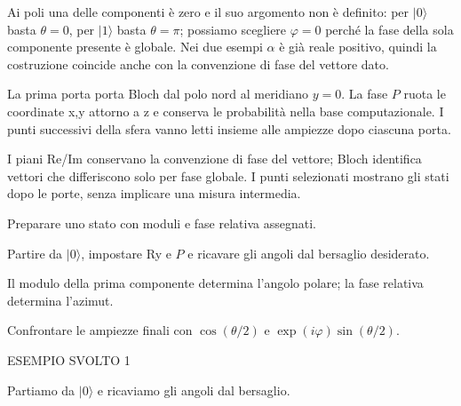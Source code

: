 Ai poli una delle componenti è zero e il suo argomento non è definito: per \(|0\rangle \) basta \(\theta =0\), per \(|1\rangle \) basta \(\theta =\pi \); possiamo scegliere \(\varphi =0\) perché la fase della sola componente presente è globale. Nei due esempi \(\alpha \) è già reale positivo, quindi la costruzione coincide anche con la convenzione di fase del vettore dato.\par

La prima porta porta Bloch dal polo nord al meridiano \(y=0\). La fase \(P\) ruota le coordinate x,y attorno a z e conserva le probabilità nella base computazionale. I punti successivi della sfera vanno letti insieme alle ampiezze dopo ciascuna porta.\par



I piani Re/Im conservano la convenzione di fase del vettore; Bloch identifica vettori che differiscono solo per fase globale. I punti selezionati mostrano gli stati dopo le porte, senza implicare una misura intermedia.\par



Preparare uno stato con moduli e fase relativa assegnati.\par

Partire da \(|0\rangle \), impostare Ry e \(P\) e ricavare gli angoli dal bersaglio desiderato.\par

Il modulo della prima componente determina l'angolo polare; la fase relativa determina l'azimut.\par

Confrontare le ampiezze finali con \(\cos (\theta /2)\) e \(\allowbreak\exp (i\varphi )\sin (\theta /2)\).\par


\Needspace{.36\textheight}\label{c3-preparazione-example-1}
{\sffamily\small\color{Accent} ESEMPIO SVOLTO 1\par}
Partiamo da \(|0\rangle \) e ricaviamo gli angoli dal bersaglio.\par


